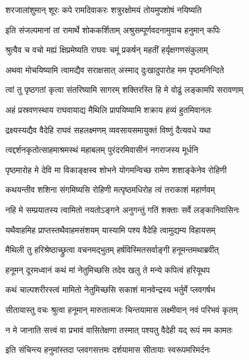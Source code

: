 \twolineshloka
{शरजालांशुमान् शूरः कपे रामदिवाकरः}
{शत्रुरक्षोमयं तोयमुपशोषं नयिष्यति} %

\twolineshloka
{इति संजल्पमानां तां रामार्थे शोककर्शिताम्}
{अश्रुसम्पूर्णवदनामुवाच हनुमान् कपिः} %

\twolineshloka
{श्रुत्वैव च वचो मह्यं क्षिप्रमेष्यति राघवः}
{चमूं प्रकर्षन् महतीं हर्यृक्षगणसंकुलाम्} %

\twolineshloka
{अथवा मोचयिष्यामि त्वामद्यैव सराक्षसात्}
{अस्माद् दुःखादुपारोह मम पृष्ठमनिन्दिते} %

\twolineshloka
{त्वां तु पृष्ठगतां कृत्वा संतरिष्यामि सागरम्}
{शक्तिरस्ति हि मे वोढुं लङ्कामपि सरावणाम्} %

\twolineshloka
{अहं प्रस्रवणस्थाय राघवायाद्य मैथिलि}
{प्रापयिष्यामि शक्राय हव्यं हुतमिवानलः} %

\twolineshloka
{द्रक्ष्यस्यद्यैव वैदेहि राघवं सहलक्ष्मणम्}
{व्यवसायसमायुक्तं विष्णुं दैत्यवधे यथा} %

\twolineshloka
{त्वद्दर्शनकृतोत्साहमाश्रमस्थं महाबलम्}
{पुरंदरमिवासीनं नगराजस्य मूर्धनि} %

\twolineshloka
{पृष्ठमारोह मे देवि मा विकाङ्क्षस्व शोभने}
{योगमन्विच्छ रामेण शशाङ्केनेव रोहिणी} %

\twolineshloka
{कथयन्तीव शशिना संगमिष्यसि रोहिणी}
{मत्पृष्ठमधिरोह त्वं तराकाशं महार्णवम्} %

\twolineshloka
{नहि मे सम्प्रयातस्य त्वामितो नयतोऽङ्गने}
{अनुगन्तुं गतिं शक्ताः सर्वे लङ्कानिवासिनः} %

\twolineshloka
{यथैवाहमिह प्राप्तस्तथैवाहमसंशयम्}
{यास्यामि पश्य वैदेहि त्वामुद्यम्य विहायसम्} %

\twolineshloka
{मैथिली तु हरिश्रेष्ठाच्छ्रुत्वा वचनमद्भुतम्}
{हर्षविस्मितसर्वाङ्गी हनूमन्तमथाब्रवीत्} %

\twolineshloka
{हनूमन् दूरमध्वानं कथं मां नेतुमिच्छसि}
{तदेव खलु ते मन्ये कपित्वं हरियूथप} %

\twolineshloka
{कथं चाल्पशरीरस्त्वं मामितो नेतुमिच्छसि}
{सकाशं मानवेन्द्रस्य भर्तुर्मे प्लवगर्षभ} %

\twolineshloka
{सीतायास्तु वचः श्रुत्वा हनूमान् मारुतात्मजः}
{चिन्तयामास लक्ष्मीवान् नवं परिभवं कृतम्} %

\twolineshloka
{न मे जानाति सत्त्वं वा प्रभावं वासितेक्षणा}
{तस्मात् पश्यतु वैदेही यद् रूपं मम कामतः} %

\twolineshloka
{इति संचिन्त्य हनुमांस्तदा प्लवगसत्तमः}
{दर्शयामास सीतायाः स्वरूपमरिमर्दनः} %

